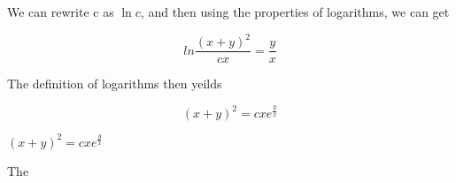 \documentclass{report}
\begin{document}
We can rewrite c as $\ln{c}$, and then using the properties of logarithms, we can get

\[
    ln{\frac{(x+y)^2}{cx}} = \frac{y}{x}
\]

The definition of logarithms then yeilds

\[
    (x+y)^2 = cxe^\frac{y}{x}
\]

\ans $(x+y)^2 = cxe^\frac{y}{x}$

\medskip


The 
\end{document}
